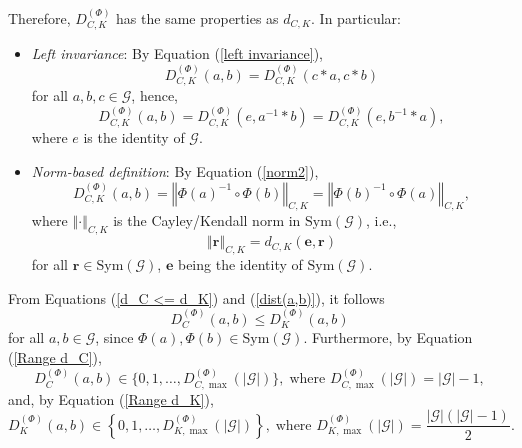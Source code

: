 \documentclass{article}
\begin{document}
Therefore, $D_{C,K}^{(\Phi )}$ has the same properties as $d_{C,K}$. In
particular:

\begin{itemize}
\item \textit{Left invariance}: By Equation (\ref{left invariance}),%
\begin{equation}
D_{C,K}^{(\Phi )}(a,b)=D_{C,K}^{(\Phi )}(c\ast a,c\ast b)  \label{Left inv D}
\end{equation}%
for all $a,b,c\in \mathcal{G}$, hence,%
\begin{equation}
D_{C,K}^{(\Phi )}(a,b)=D_{C,K}^{(\Phi )}(e,a^{-1}\ast b)=D_{C,K}^{(\Phi
)}(e,b^{-1}\ast a),  \label{Left inv D 2}
\end{equation}%
where $e$ is the identity of $\mathcal{G}$.

\item \textit{Norm-based definition}: By Equation (\ref{norm2}),%
\begin{equation}
D_{C,K}^{(\Phi )}(a,b)=\left\Vert \Phi (a)^{-1}\circ \Phi (b)\right\Vert
_{C,K}=\left\Vert \Phi (b)^{-1}\circ \Phi (a)\right\Vert _{C,K},
\label{dist(a,b) 2}
\end{equation}%
where $\left\Vert \cdot \right\Vert _{C,K}$ is the Cayley/Kendall norm in $%
\mathrm{Sym}(\mathcal{G})$, i.e.,%
\begin{equation}
\left\Vert \mathbf{r}\right\Vert _{C,K}=d_{C,K}(\mathbf{e},\mathbf{r})
\label{norm C,K}
\end{equation}%
for all $\mathbf{r}\in \mathrm{Sym}(\mathcal{G})$, $\mathbf{e}$ being the
identity of $\mathrm{Sym}(\mathcal{G}).$
\end{itemize}

From Equations (\ref{d_C <= d_K}) and (\ref{dist(a,b)}), it follows%
\begin{equation}
D_{C}^{(\Phi )}(a,b)\leq D_{K}^{(\Phi )}(a,b)  \label{D_C<=D_K}
\end{equation}%
for all $a,b\in \mathcal{G}$, since $\Phi (a),\Phi (b)\in \mathrm{Sym}(%
\mathcal{G})$. Furthermore, by Equation (\ref{Range d_C}),%
\begin{equation}
D_{C}^{(\Phi )}(a,b)\in \{0,1,\ldots,D_{C,\max }^{(\Phi )}(\left\vert \mathcal{G%
}\right\vert )\},\;\text{where }D_{C,\max }^{(\Phi )}(\left\vert \mathcal{G}%
\right\vert )=\left\vert \mathcal{G}\right\vert -1,  \label{DC max}
\end{equation}%
and, by Equation (\ref{Range d_K}), 
\begin{equation}
D_{K}^{(\Phi )}(a,b)\in \left\{ 0,1,\ldots,D_{K,\max }^{(\Phi )}(\left\vert 
\mathcal{G}\right\vert )\right\} ,\;\text{where }D_{K,\max }^{(\Phi
)}(\left\vert \mathcal{G}\right\vert )=\frac{\left\vert \mathcal{G}%
\right\vert (\left\vert \mathcal{G}\right\vert -1)}{2}.  \label{DK max}
\end{equation}
\end{document}
